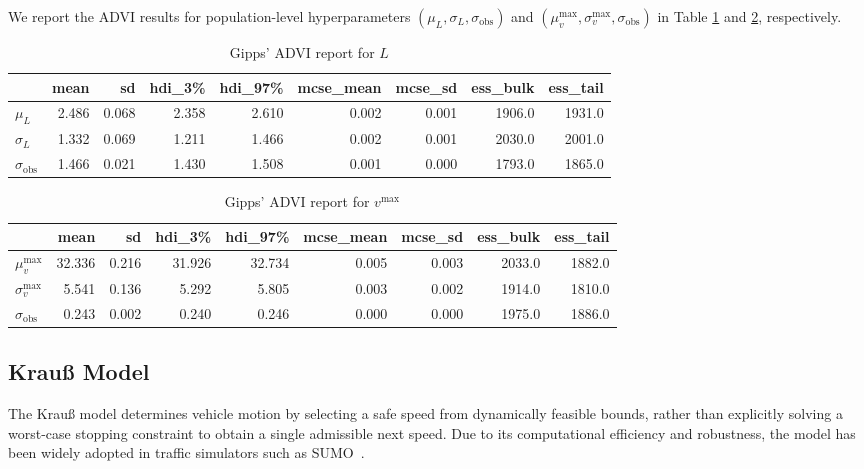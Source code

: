 \documentclass[journal]{IEEEtran}
\begin{document}
We report the ADVI results for population-level hyperparameters $(\mu_L,\sigma_L,\sigma_{\text{obs}})$ and $(\mu_v^{\max},\sigma_v^{\max},\sigma_{\text{obs}})$ in Table \ref{tab:GippsCA} and \ref{tab:GippsFF}, respectively.

\begin{table}[th]
    \centering
    \caption{Gipps' ADVI report for $L$}
    \label{tab:GippsCA}
    \begin{tabular}{lrrrrrrrr}
        \toprule
        {} & mean & sd & hdi\_3\% & hdi\_97\% & mcse\_mean & mcse\_sd & ess\_bulk & ess\_tail \\
        \midrule
        $\mu_L$      & 2.486 & 0.068 & 2.358 & 2.610 & 0.002 & 0.001 & 1906.0 & 1931.0 \\
        $\sigma_L$   & 1.332 & 0.069 & 1.211 & 1.466 & 0.002 & 0.001 & 2030.0 & 2001.0 \\
        $\sigma_{\text{obs}}$ & 1.466 & 0.021 & 1.430 & 1.508 & 0.001 & 0.000 & 1793.0 & 1865.0 \\
        \bottomrule
    \end{tabular}
\end{table}

\begin{table}[th]
    \centering
    \caption{Gipps' ADVI report for $v^{\max}$}
    \label{tab:GippsFF}
    \begin{tabular}{lrrrrrrrr}
        \toprule
        {} & mean  & sd    & hdi\_3\% & hdi\_97\% & mcse\_mean & mcse\_sd & ess\_bulk & ess\_tail \\
        \midrule
        $\mu_v^{\max}$   & 32.336 & 0.216 & 31.926 & 32.734 & 0.005 & 0.003 & 2033.0 & 1882.0 \\
        $\sigma_v^{\max}$ & 5.541 & 0.136 & 5.292 & 5.805 & 0.003 & 0.002 & 1914.0 & 1810.0 \\
        $\sigma_{\text{obs}}$ & 0.243 & 0.002 & 0.240 & 0.246 & 0.000 & 0.000 & 1975.0 & 1886.0 \\
        \bottomrule
    \end{tabular}
\end{table}

\subsection{Krau{\ss} Model}\label{subsec:krauss}

The Krau{\ss} model determines vehicle motion by selecting a safe speed from dynamically feasible bounds, rather than explicitly solving a worst-case stopping constraint to obtain a single admissible next speed. Due to its computational efficiency and robustness, the model has been widely adopted in traffic simulators such as SUMO~\cite{SUMO2018}.
\end{document}
